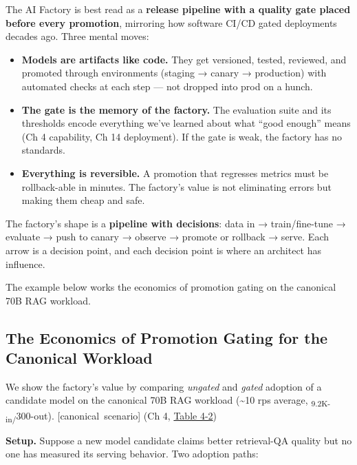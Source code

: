 \label{mental-model}


The AI Factory is best read as a \textbf{release pipeline with a quality
gate placed before every promotion}, mirroring how software CI/CD gated
deployments decades ago. Three mental moves:

\begin{itemize}
\tightlist
\item
  \textbf{Models are artifacts like code.} They get versioned, tested,
  reviewed, and promoted through environments (staging → canary →
  production) with automated checks at each step --- not dropped into
  prod on a hunch.
\item
  \textbf{The gate is the memory of the factory.} The evaluation suite
  and its thresholds encode everything we've learned about what ``good
  enough'' means (Ch 4 capability, Ch 14 deployment). If the gate is
  weak, the factory has no standards.
\item
  \textbf{Everything is reversible.} A promotion that regresses metrics
  must be rollback-able in minutes. The factory's value is not
  eliminating errors but making them cheap and safe.
\end{itemize}

The factory's shape is a \textbf{pipeline with decisions}: data in →
train/fine-tune → evaluate → push to canary → observe → promote or
rollback → serve. Each arrow is a decision point, and each decision
point is where an architect has influence.

\label{worked-example}


The example below works the economics of promotion gating on the
canonical 70B RAG workload.

\subsection{The Economics of Promotion Gating for the Canonical
Workload}\label{the-economics-of-promotion-gating-for-the-canonical-workload}

We show the factory's value by comparing \emph{ungated} and \emph{gated}
adoption of a candidate model on the canonical 70B RAG workload
(\textasciitilde10 rps average, \textsubscript{9.2K-in/}300-out).
\mbox{{[}canonical scenario{]}} (Ch 4, \hyperref[tab:4.2]{Table 4-2})

\textbf{Setup.} Suppose a new model candidate claims better retrieval-QA
quality but no one has measured its serving behavior. Two adoption
paths:

